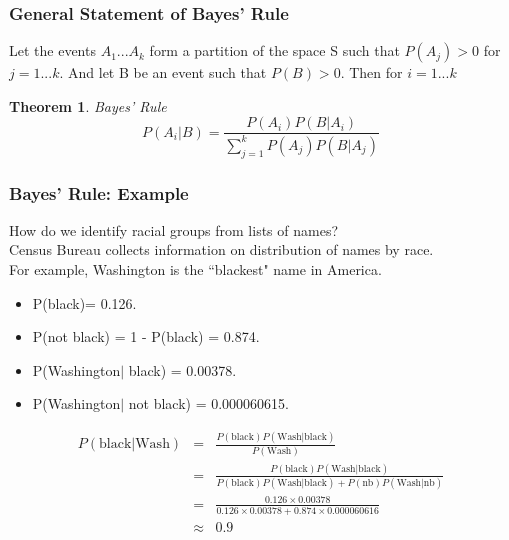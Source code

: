 \documentclass[handout]{beamer}
\newtheorem{thm}{Theorem}
\numberwithin{equation}{section}
\begin{document}
\begin{frame}
\frametitle{General Statement of Bayes' Rule}
Let the events $A_1...A_k$ form a partition of the space S such that $P(A_j)>0$ for $j=1...k$.
And let B be an event such that $P(B)>0$.  Then for $i=1...k$
 
 \begin{thm}{Bayes' Rule}
  $$P(A_i|B)=\frac{P(A_i)P(B|A_i)}{\sum_{j=1}^{k}P(A_j)P(B|A_j)}$$
\end{thm}
\end{frame}




\begin{frame}
\frametitle{Bayes' Rule: Example} 

How do we identify racial groups from lists of names?  \pause \\
Census Bureau collects information on distribution of names by race. \pause  \\
For example, \alert{Washington} is the ``\alert{blackest}" name in America. \pause\\
\begin{itemize}
\item[-] P(black)= 0.126.
\item[-] P(not black) = 1 - P(black) = 0.874. 
\item[-] P(Washington$|$ black) = 0.00378.
\item[-] P(Washington$|$ not black) = 0.000060615. \pause 
\end{itemize}

\begin{eqnarray}
P(\text{black}|\text{Wash} ) & = & \frac{P(\text{black}) P(\text{Wash}| \text{black}) }{P(\text{Wash} ) } \nonumber \\
 & = & \frac{P(\text{black}) P(\text{Wash}| \text{black}) }{P(\text{black})P(\text{Wash}|\text{black}) + P(\text{nb})P(\text{Wash}| \text{nb}) } \nonumber\\
 & = & \frac{0.126 \times 0.00378}{0.126\times 0.00378 + 0.874 \times 0.000060616} \nonumber\\
 & \approx & 0.9 \nonumber  
 \end{eqnarray}


\end{frame}
\end{document}
